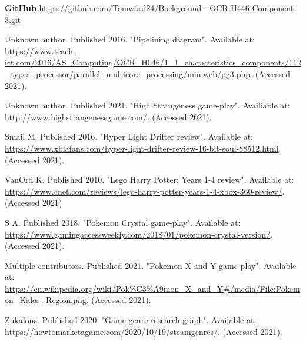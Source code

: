 \documentclass[12pt]{report}
\begin{document}
\textbf{GitHub}  
\newline
\url{https://github.com/Tomward24/Background---OCR-H446-Component-3.git}

\pagebreak

\begin{thebibliography}{}

 Unknown author. Published 2016. "Pipelining diagram". Available at: \url{https://www.teach-ict.com/2016/AS_Computing/OCR_H046/1_1_characteristics_components/112_types_processor/parallel_multicore_processing/miniweb/pg3.php}. (Accessed 2021).

 Unknown author. Published 2021. "High Strangeness game-play". Availiable at: \url{http://www.highstrangenessgame.com/}. (Accessed 2021).

 Smail M. Published 2016. "Hyper Light Drifter review". Available at: \url{https://www.xblafans.com/hyper-light-drifter-review-16-bit-soul-88512.html}. (Accessed 2021).

 VanOrd K. Published 2010. "Lego Harry Potter; Years 1-4 review". Available at: \url{https://www.cnet.com/reviews/lego-harry-potter-years-1-4-xbox-360-review/}. (Accessed 2021)

 S A. Published 2018. "Pokemon Crystal game-play". Available at: \url{https://www.gamingaccessweekly.com/2018/01/pokemon-crystal-version/}. (Accessed 2021).

 Multiple contributors. Published 2021. "Pokemon X and Y game-play". Available at: \url{https://en.wikipedia.org/wiki/Pok\%C3\%A9mon_X_and_Y#/media/File:Pokemon_Kalos_Region.png}. (Accessed 2021).

 Zukalous. Published 2020. "Game genre research graph". Available at: \url{https://howtomarketagame.com/2020/10/19/steamgenres/}. (Accessed 2021).

\end{thebibliography}
\end{document}
